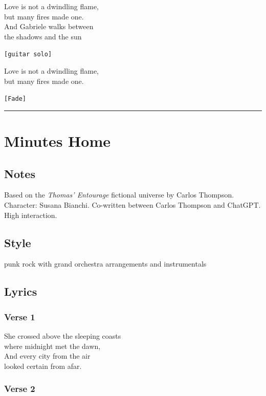 Love is not a dwindling flame,\\
but many fires made one.\\
And Gabriele walks between\\
the shadows and the sun

\texttt{{[}guitar\ solo{]}}

Love is not a dwindling flame,\\
but many fires made one.

\texttt{{[}Fade{]}}

\begin{center}\rule{0.5\linewidth}{0.5pt}\end{center}

\section{Minutes Home}\label{minutes-home}

\subsection{Notes}\label{notes-3}

Based on the \emph{Thomas' Entourage} fictional universe by Carlos
Thompson. Character: Susana Bianchi. Co-written between Carlos Thompson
and ChatGPT. High interaction.

\subsection{Style}\label{style-3}

punk rock with grand orchestra arrangements and instrumentals

\subsection{Lyrics}\label{lyrics-3}

\subsubsection{Verse 1}\label{verse-1-1}

She crossed above the sleeping coasts\\
where midnight met the dawn,\\
And every city from the air\\
looked certain from afar.

\subsubsection{Verse 2}\label{verse-2-1}

